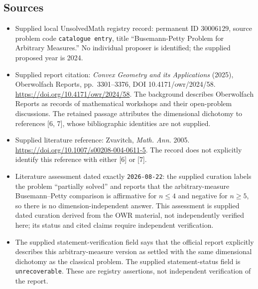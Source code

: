 \documentclass[11pt]{article}
\begin{document}
\subsection{Sources}
\begin{itemize}
\item Supplied local UnsolvedMath registry record: permanent ID \(30006129\), source problem code \texttt{catalogue entry}, title ``Busemann-Petty Problem for Arbitrary Measures.'' No individual proposer is identified; the supplied proposed year is 2024.
\item Supplied report citation: \emph{Convex Geometry and its Applications} (2025), Oberwolfach Reports, pp.~3301--3376, DOI 10.4171/owr/2024/58. \url{https://doi.org/10.4171/owr/2024/58}. The background describes Oberwolfach Reports as records of mathematical workshops and their open-problem discussions. The retained passage attributes the dimensional dichotomy to references [6, 7], whose bibliographic identities are not supplied.
\item Supplied literature reference: Zvavitch, \emph{Math. Ann.} 2005. \url{https://doi.org/10.1007/s00208-004-0611-5}. The record does not explicitly identify this reference with either [6] or [7].
\item Literature assessment dated exactly \texttt{2026-08-22}: the supplied curation labels the problem ``partially solved'' and reports that the arbitrary-measure Busemann--Petty comparison is affirmative for \(n\leq4\) and negative for \(n\geq5\), so there is no dimension-independent answer. This assessment is supplied dated curation derived from the OWR material, not independently verified here; its status and cited claims require independent verification.
\item The supplied statement-verification field says that the official report explicitly describes this arbitrary-measure version as settled with the same dimensional dichotomy as the classical problem. The supplied statement-status field is \texttt{unrecoverable}. These are registry assertions, not independent verification of the report.
\end{itemize}
\end{document}
